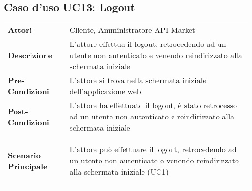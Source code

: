 \newpage
\subsection{Caso d'uso UC13: Logout}
\label{UC13}

\begin{longtable}{ l | p{11cm}}
	\hline
	\rowcolor{Gray}
	\multicolumn{2}{c}{UC13 - Logout} \\
	\hline
	\textbf{Attori} & Cliente, Amministratore API Market \\
	\textbf{Descrizione} & L'attore effettua il logout, retrocedendo ad un utente non autenticato e venendo reindirizzato alla schermata iniziale \\
	\textbf{Pre-Condizioni} & L'attore si trova nella schermata iniziale dell'applicazione web \\
	\textbf{Post-Condizioni}& L'attore ha effettuato il logout, è stato retrocesso ad un utente non autenticato e reindirizzato alla schermata iniziale \\
	\textbf{Scenario Principale} & 
	\begin{enumerate*}[label=(\arabic*.),itemjoin={\newline}]
		\item L'attore può effettuare il logout, retrocedendo ad un utente non autenticato e venendo reindirizzato alla schermata iniziale (UC1)
	\end{enumerate*}\\
\end{longtable}